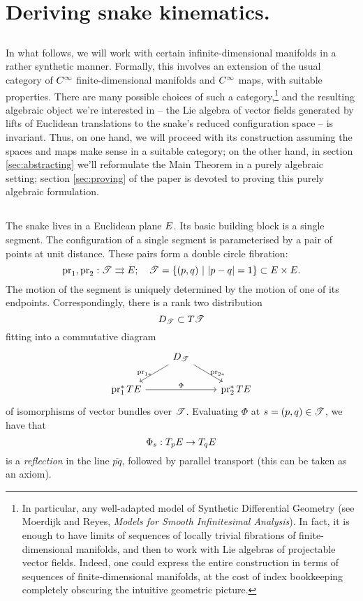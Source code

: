 \section{Deriving snake kinematics.}
\label{sec:deriving}
\subsection*{}
In what follows, we will work with certain infinite-dimensional manifolds 
in a rather synthetic manner. Formally, this involves an extension of the
usual category of $\Cinf$ finite-dimensional manifolds and $\Cinf$ maps, with
suitable properties. There are many possible choices of such a category,\footnote{
In particular, any well-adapted model of Synthetic Differential Geometry
(see Moerdijk and Reyes, \textit{Models for Smooth Infinitesimal Analysis}). In fact,
it is enough to have limits of sequences of locally trivial fibrations of 
finite-dimensional manifolds, and then to work with Lie algebras of projectable 
vector fields. Indeed, one could express the entire construction in terms of 
sequences of finite-dimensional manifolds, at the cost of index bookkeeping 
completely obscuring the intuitive geometric picture. 
}
and the resulting algebraic object we're interested in -- the Lie algebra of 
vector fields generated by lifts of Euclidean translations to the snake's 
reduced configuration space -- is invariant. Thus, on one hand, we will 
proceed with its construction assuming the spaces and maps make sense in
a suitable category; on the other hand, in section \ref{sec:abstracting} we'll reformulate the
Main Theorem in a purely algebraic setting; section \ref{sec:proving} of the paper
is devoted to proving this purely algebraic formulation.


\subsection{}
The snake lives in a Euclidean plane $\E$. Its basic building block
is a single segment. The configuration of a single segment is
parameterised by a pair of points at unit distance. These pairs
form a double circle fibration:
\[
    \pr_1, \pr_2 : \S\rightrightarrows \E;\quad \S = \{ (p,q)\ |\ |p-q|=1 \} \subset \E \times \E.
\]
The motion of the segment is uniquely determined by
the motion of one of its endpoints. Correspondingly, there
is a rank two distribution
\[
    \D_\S \subset T\S
\]
fitting into a commutative diagram
\[
\begin{tikzcd}
           &  \D_\S 
           \arrow[ld, "\pr_{1*}" left]
           \arrow[rd, "\pr_{2*}" right]
           & \\
        \pr_1^* T\E  
           \arrow[rr, "\Phi"]
           & &   \pr_2^* T\E
\end{tikzcd}
\]
of isomorphisms of vector bundles over $\S$. Evaluating $\Phi$ at $s=(p,q) \in \S$,
we have that 
\[
    \Phi_s : T_p \E \to T_q \E
\] 
is a \emph{reflection} in the line $\overline{pq}$, followed by parallel transport
(this can be taken as an axiom).

